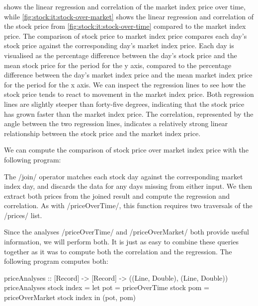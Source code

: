 

 shows the linear regression and correlation of the market index price over time, while \cref{fig:stock:it:stock-over-market} shows the linear regression and correlation of the stock price from \cref{fig:stock:it:stock-over-time} compared to the market index price.
The comparison of stock price to market index price compares each day's stock price against the corresponding day's market index price.
Each day is visualised as the percentage difference between the day's stock price and the mean stock price for the period for the y axis, compared to the percentage difference between the day's market index price and the mean market index price for the period for the x axis.
We can inspect the regression lines to see how the stock price tends to react to movement in the market index price.
Both regression lines are slightly steeper than forty-five degrees, indicating that the stock price has grown faster than the market index price.
The correlation, represented by the angle between the two regression lines, indicates a relatively strong linear relationship between the stock price and the market index price.

We can compute the comparison of stock price over market index price with the following program:


The \Hs/join/ operator matches each stock day against the corresponding market index day, and discards the data for any days missing from either input.
We then extract both prices from the joined result and compute the regression and correlation.
As with \Hs/priceOverTime/, this function requires two traversals of the \Hs/prices/ list.

Since the analyses \Hs/priceOverTime/ and \Hs/priceOverMarket/ both provide useful information, we will perform both.
It is just as easy to combine these queries together as it was to compute both the correlation and the regression.
The following program computes both:

\begin{haskell}
priceAnalyses :: [Record] -> [Record] -> ((Line, Double), (Line, Double))
priceAnalyses stock index =
  let pot = priceOverTime   stock
      pom = priceOverMarket stock index
  in (pot, pom)
\end{haskell}

